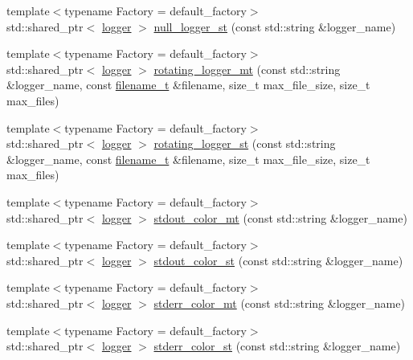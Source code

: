 \begin{DoxyCompactItemize}
\item 
{\footnotesize template$<$typename Factory  = default\+\_\+factory$>$ }\\std\+::shared\+\_\+ptr$<$ \hyperlink{classspdlog_1_1logger}{logger} $>$ \hyperlink{namespacespdlog_af6a7d6f86b50ab1c5c346949ca5af564}{null\+\_\+logger\+\_\+st} (const std\+::string \&logger\+\_\+name)
\item 
{\footnotesize template$<$typename Factory  = default\+\_\+factory$>$ }\\std\+::shared\+\_\+ptr$<$ \hyperlink{classspdlog_1_1logger}{logger} $>$ \hyperlink{namespacespdlog_a42401c73c1dede7000852f7229b7aa9c}{rotating\+\_\+logger\+\_\+mt} (const std\+::string \&logger\+\_\+name, const \hyperlink{namespacespdlog_acf7ce125b3622e44f8f1702d699e0b06}{filename\+\_\+t} \&filename, size\+\_\+t max\+\_\+file\+\_\+size, size\+\_\+t max\+\_\+files)
\item 
{\footnotesize template$<$typename Factory  = default\+\_\+factory$>$ }\\std\+::shared\+\_\+ptr$<$ \hyperlink{classspdlog_1_1logger}{logger} $>$ \hyperlink{namespacespdlog_aa94a9f4d699643b6cdecf107ec5340d6}{rotating\+\_\+logger\+\_\+st} (const std\+::string \&logger\+\_\+name, const \hyperlink{namespacespdlog_acf7ce125b3622e44f8f1702d699e0b06}{filename\+\_\+t} \&filename, size\+\_\+t max\+\_\+file\+\_\+size, size\+\_\+t max\+\_\+files)
\item 
{\footnotesize template$<$typename Factory  = default\+\_\+factory$>$ }\\std\+::shared\+\_\+ptr$<$ \hyperlink{classspdlog_1_1logger}{logger} $>$ \hyperlink{namespacespdlog_a903467b7174af13d10f2f29ae9bd4a6e}{stdout\+\_\+color\+\_\+mt} (const std\+::string \&logger\+\_\+name)
\item 
{\footnotesize template$<$typename Factory  = default\+\_\+factory$>$ }\\std\+::shared\+\_\+ptr$<$ \hyperlink{classspdlog_1_1logger}{logger} $>$ \hyperlink{namespacespdlog_a1d20b70d425e5402b3fa6a1b075d1c6d}{stdout\+\_\+color\+\_\+st} (const std\+::string \&logger\+\_\+name)
\item 
{\footnotesize template$<$typename Factory  = default\+\_\+factory$>$ }\\std\+::shared\+\_\+ptr$<$ \hyperlink{classspdlog_1_1logger}{logger} $>$ \hyperlink{namespacespdlog_ab4647f73157c2a5647097e993eb648f5}{stderr\+\_\+color\+\_\+mt} (const std\+::string \&logger\+\_\+name)
\item 
{\footnotesize template$<$typename Factory  = default\+\_\+factory$>$ }\\std\+::shared\+\_\+ptr$<$ \hyperlink{classspdlog_1_1logger}{logger} $>$ \hyperlink{namespacespdlog_a5564a799e789be1856d238b0d91ecadb}{stderr\+\_\+color\+\_\+st} (const std\+::string \&logger\+\_\+name)

\end{DoxyCompactItemize}
